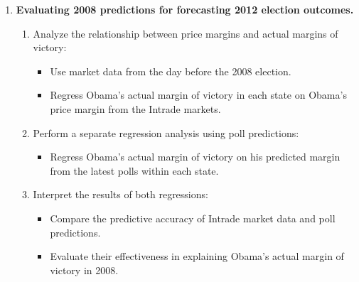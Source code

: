 \documentclass[12pt]{article}
\begin{document}
\begin{enumerate}
    \item \textbf{Evaluating 2008 predictions for forecasting 2012 election outcomes.}
    \begin{enumerate}[label=(\alph*)]
        \item Analyze the relationship between price margins and actual margins of victory:
        \begin{itemize}
            \item Use market data from the day before the 2008 election.
            \item Regress Obama’s actual margin of victory in each state on Obama’s price margin from the Intrade markets.
        \end{itemize}
        \item Perform a separate regression analysis using poll predictions:
        \begin{itemize}
            \item Regress Obama’s actual margin of victory on his predicted margin from the latest polls within each state.
        \end{itemize}
        \item Interpret the results of both regressions:
        \begin{itemize}
            \item Compare the predictive accuracy of Intrade market data and poll predictions.
            \item Evaluate their effectiveness in explaining Obama’s actual margin of victory in 2008.
        \end{itemize}
    \end{enumerate}

\end{enumerate}
\end{document}
